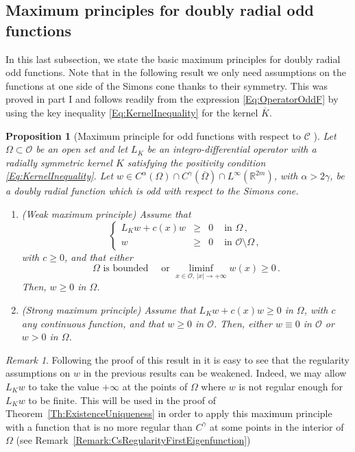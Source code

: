 \documentclass[12pt,reqno]{amsart}
\newtheorem{proposition}[theorem]{Proposition}
\theoremstyle{definition}
\theoremstyle{remark}
\newtheorem{remark}[theorem]{Remark}
\newcommand{\con}[1]{\mathbb{#1}}
\newcommand{\R}{\con{R}} %
\newcommand{\ccal}{\mathscr{C}}
\newcommand{\ocal}{\mathcal{O}}
\newcommand{\s}{\gamma}
\newcommand\beqc[1]{\left\{\begin{array}{#1}}
\newcommand\eeqc{\end{array} \right.}
\def\PDEsystem{rcll}
\numberwithin{equation}{section}
\begin{document}
\subsection{Maximum principles for doubly radial odd functions}
\label{Subsec:MaxPrinciples}

In this last subsection, we state the basic maximum principles for doubly radial odd functions. Note that in the following result we only need assumptions on the functions at one side of the Simons cone thanks to their symmetry. This was proved in part I \cite{FelipeSanz-Perela:IntegroDifferentialI} and follows readily from the expression \eqref{Eq:OperatorOddF} by using the key inequality \eqref{Eq:KernelInequality} for the kernel $\overline{K}$.

\begin{proposition}[Maximum principle for odd functions with respect to $\ccal$ \cite{FelipeSanz-Perela:IntegroDifferentialI}]
	\label{Prop:MaximumPrincipleForOddFunctions} Let $\Omega \subset \ocal$ be an open set and let $L_K$ be an integro-differential operator with a radially symmetric kernel $K$ satisfying the positivity condition \eqref{Eq:KernelInequality}.  Let $w\in C^{\alpha}(\Omega)\cap C^{\s}(\overline{\Omega})\cap L^\infty(\R^{2m})$, with $\alpha > 2\s$, be a doubly radial function which is odd with respect to the Simons cone. 
	
	\begin{enumerate}[label=(\roman{*})]
		\item  (Weak maximum principle)
		Assume that
		$$
		\beqc{\PDEsystem}
		L_K w + c(x) w & \geq & 0 & \text{ in } \Omega\,,\\
		w & \geq & 0 & \text{ in } \ocal \setminus \Omega\,,
		\eeqc
		$$
		with $c \geq 0$, and that either
		$$
		\Omega \text{ is bounded} \quad \text{ or } \liminf_{x \in \ocal,\,|x|\to +\infty} w(x) \geq 0\,.
		$$
		Then, $w \geq 0$ in $\Omega$.
		
		\item (Strong maximum principle)  
		Assume that $L_K w + c(x) w\geq 0$ in $\Omega$, with $c$ any continuous function, and that $w\geq 0$ in $\ocal$. Then, either $w\equiv 0$ in $\ocal$ or $w > 0$ in $\Omega$.
	\end{enumerate} 
\end{proposition}

\begin{remark}
	\label{Remark:MaxPrincipleSingularity}
	Following the proof of this result in \cite{FelipeSanz-Perela:IntegroDifferentialI} it is easy to see that the regularity assumptions on $w$ in the previous results can be weakened. Indeed, we may allow $L_K w$ to take the value $+\infty$ at the points of $\Omega$ where $w$ is not regular enough for $L_K w$ to be finite. This will be used in the proof of Theorem~\ref{Th:ExistenceUniqueness} in order to apply this maximum principle with a function that is no more regular than $C^\s$ at some points in the interior of $\Omega$ (see Remark~\ref{Remark:CsRegularityFirstEigenfunction})
\end{remark}
\end{document}
